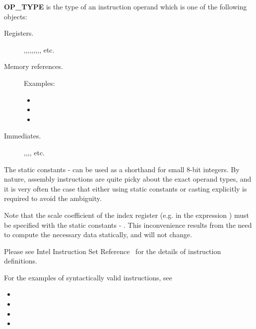 \documentclass{article}
\begin{document}
{\bf OP{\_}TYPE} is the type of an instruction operand
which is one of the following objects:
\begin{description}
\item[Registers.] ,,,,,,,,, etc.
\item[Memory references.]  Examples:
  \begin{itemize}
  \item  {}
  \item  {}
  \item  {}
  \end{itemize}

\item[Immediates.] ,,,, etc. 
\end{description}

The static constants - can be used as a shorthand for small
8-bit integers. By nature, assembly instructions are quite picky about
the exact operand types, and it is very often the case that either
using static constants or casting explicitly is required to avoid the
ambiguity.

Note that the scale coefficient of the index register (e.g.  in
the expression ) must be specified with the static
constants  - . This inconvenience results from the need to
compute the necessary data statically, and will not change.

Please see Intel  Instruction Set Reference~\cite{intel:insn_ref} for
the details of instruction definitions.

For the examples of syntactically valid instructions, see

\begin{itemize}
\item {}
\item {}
\item {}
\item {}
\end{itemize}
\end{document}
